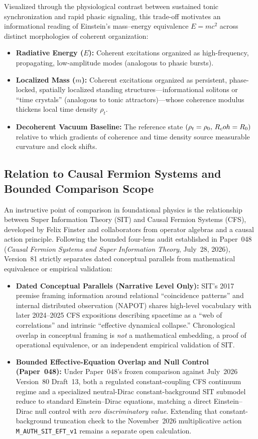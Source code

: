 Visualized through the physiological contrast between sustained tonic synchronization and rapid phasic signaling, this trade-off motivates an informational reading of Einstein's mass--energy equivalence $E = mc^2$ across distinct morphologies of coherent organization:
\begin{itemize}
  \item \textbf{Radiative Energy ($E$):} Coherent excitations organized as high-frequency, propagating, low-amplitude modes (analogous to phasic bursts).
  \item \textbf{Localized Mass ($m$):} Coherent excitations organized as persistent, phase-locked, spatially localized standing structures---informational solitons or ``time crystals'' (analogous to tonic attractors)---whose coherence modulus thickens local time density $\rho_t$.
  \item \textbf{Decoherent Vacuum Baseline:} The reference state $(\rho_t = \rho_0,\, R_coh = R_0)$ relative to which gradients of coherence and time density source measurable curvature and clock shifts.
\end{itemize}

\subsection{Relation to Causal Fermion Systems and Bounded Comparison Scope}
\label{sec:cfs-convergence}

An instructive point of comparison in foundational physics is the relationship between Super Information Theory (SIT) and Causal Fermion Systems (CFS), developed by Felix Finster and collaborators from operator algebras and a causal action principle. Following the bounded four-lens audit established in Paper~048 (\emph{Causal Fermion Systems and Super Information Theory}, July~28, 2026), Version~81 strictly separates dated conceptual parallels from mathematical equivalence or empirical validation:
\begin{itemize}
  \item \textbf{Dated Conceptual Parallels (Narrative Level Only):} SIT's 2017 premise framing information around relational ``coincidence patterns'' and internal distributed observation (NAPOT) shares high-level vocabulary with later 2024--2025 CFS expositions describing spacetime as a ``web of correlations'' and intrinsic ``effective dynamical collapse.'' Chronological overlap in conceptual framing is \emph{not} a mathematical embedding, a proof of operational equivalence, or an independent empirical validation of SIT.
  \item \textbf{Bounded Effective-Equation Overlap and Null Control (Paper~048):} Under Paper~048's frozen comparison against July~2026 Version~80 Draft~13, both a regulated constant-coupling CFS continuum regime and a specialized neutral-Dirac constant-background SIT submodel reduce to standard Einstein--Dirac equations, matching a direct Einstein--Dirac null control with \emph{zero discriminatory value}. Extending that constant-background truncation check to the November~2026 multiplicative action \texttt{M\_AUTH\_SIT\_EFT\_v1} remains a separate open calculation.
\end{itemize}

